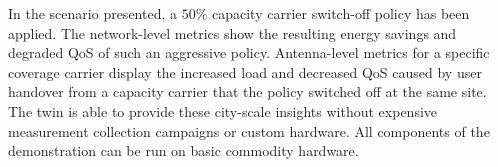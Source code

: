 \documentclass[sigconf, 10pt]{acmart}
\begin{document}
In the scenario presented, a $50\%$ capacity carrier switch-off policy has been applied. The network-level metrics show the resulting energy savings and degraded \ac{QoS} of such an aggressive policy. Antenna-level metrics for a specific coverage carrier display the increased load and decreased \ac{QoS} caused by user handover from a capacity carrier that the policy switched off at the same site. The twin is able to provide these city-scale insights without expensive measurement collection campaigns or custom hardware. All components of the demonstration can be run on basic commodity hardware.

\vspace*{-0.7em}



\end{document}

